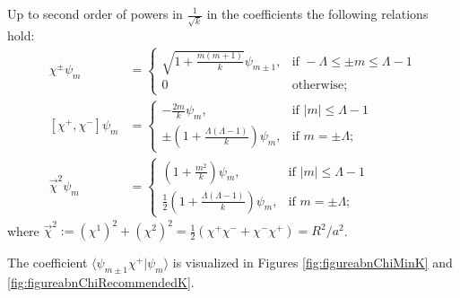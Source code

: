 \begin{proposition}%
Up to second order of powers in $\frac{1}{\sqrt{k}}$ in the coefficients the following relations hold:
\begin{align}\label{equationActionChiD2WithoutOO}
    \chi^\pm  \psi_m
        &= \begin{cases}
        \sqrt{1 + \frac{m(m+1)}{k}}  \psi_{m \pm 1}, & \text{if } -\Lambda \leq \pm m \leq \Lambda -1
        \\
        0 & \text{otherwise};
        \end{cases}\\
    \label{equationCommutatorChiD2}
    [\chi^+, \chi^-]  \psi_m
        &= \begin{cases}
         -\frac{2m}{k} \psi_{m}, & \text{if } |m| \leq \Lambda -1
        \\
        \pm \left( 1 + \frac{\Lambda(\Lambda-1)}{k} \right) \psi_{m}, & \text{if } m = \pm \Lambda ;
        \end{cases}\\
    \label{equationRChiD2}
    \vec \chi^2  \psi_m
        &= \begin{cases}
        \left( 1+ \frac{m^2}{k} \right) \psi_{m}, & \text{if } |m| \leq \Lambda -1
        \\
        \frac{1}{2} \left( 1+ \frac{\Lambda(\Lambda-1)}{k} \right) \psi_{m}, & \text{if } m = \pm \Lambda;
        \end{cases}
\end{align}
where $\vec \chi^2 := (\chi^1)^2 + (\chi^2)^2 = \frac{1}{2}(\chi^+\chi^- + \chi^-\chi^+)= R^2/a^2$.
\end{proposition}
The coefficient $\langle \psi_{m \pm 1} \chi^+ | \psi_{m}\rangle$ is visualized in Figures \ref{fig:figureabnChiMinK} and \ref{fig:figureabnChiRecommendedK}.

